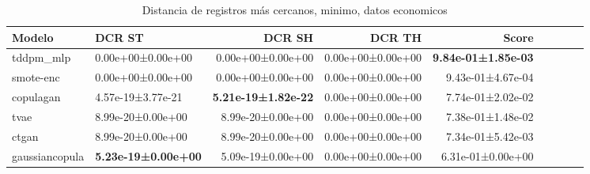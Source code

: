 \begin{table}[H]
\centering
\fontsize{10}{14}\selectfont
\caption{Distancia de registros más cercanos, minimo, datos economicos}
\label{table-dcr-economicos-b-min}
\begin{tabular}{|l|l|r|r|r|r|r|r|r|}
\hline
\rowcolor[gray]{0.8}
Modelo & DCR ST & DCR SH & DCR TH & \textbf{Score} \\
\hline tddpm\_mlp & \cellcolor[rgb]{0.9, 0.54, 0.52} 0.00e+00±0.00e+00 & \cellcolor[rgb]{0.9, 0.54, 0.52} 0.00e+00±0.00e+00 & 0.00e+00±0.00e+00 & \bfseries 9.84e-01±1.85e-03 \\
\hline smote-enc & \cellcolor[rgb]{0.9, 0.54, 0.52} 0.00e+00±0.00e+00 & \cellcolor[rgb]{0.9, 0.54, 0.52} 0.00e+00±0.00e+00 & 0.00e+00±0.00e+00 & 9.43e-01±4.67e-04 \\
\hline copulagan & 4.57e-19±3.77e-21 & \bfseries 5.21e-19±1.82e-22 & 0.00e+00±0.00e+00 & 7.74e-01±2.02e-02 \\
\hline tvae & 8.99e-20±0.00e+00 & 8.99e-20±0.00e+00 & 0.00e+00±0.00e+00 & 7.38e-01±1.48e-02 \\
\hline ctgan & 8.99e-20±0.00e+00 & 8.99e-20±0.00e+00 & 0.00e+00±0.00e+00 & 7.34e-01±5.42e-03 \\
\hline gaussiancopula & \bfseries 5.23e-19±0.00e+00 & 5.09e-19±0.00e+00 & 0.00e+00±0.00e+00 & \cellcolor[rgb]{0.9, 0.54, 0.52} 6.31e-01±0.00e+00 \\
\hline
\end{tabular}
\end{table}
